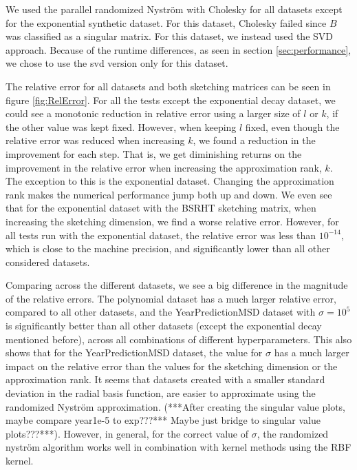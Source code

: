 \documentclass{article}
\theoremstyle{definition}
\begin{document}
We used the parallel randomized Nyström with Cholesky for all datasets except for the exponential synthetic dataset. For this dataset, Cholesky failed since $B$ was classified as a singular matrix. For this dataset, we instead used the SVD approach. Because of the runtime differences, as seen in section \ref{sec:performance}, we chose to use the svd version only for this dataset.\newline

The relative error for all datasets and both sketching matrices can be seen in figure \ref{fig:RelError}. For all the tests except the exponential decay dataset, we could see a monotonic reduction in relative error using a larger size of $l$ or $k$, if the other value was kept fixed. However, when keeping $l$ fixed, even though the relative error was reduced when increasing $k$, we found a reduction in the improvement for each step. That is, we get diminishing returns on the improvement in the relative error when increasing the approximation rank, $k$. The exception to this is the exponential dataset. Changing the approximation rank makes the numerical performance jump both up and down. We even see that for the exponential dataset with the BSRHT sketching matrix, when increasing the sketching dimension, we find a worse relative error. However, for all tests run with the exponential dataset, the relative error was less than $10^{-14}$, which is close to the machine precision, and significantly lower than all other considered datasets. \newline

Comparing across the different datasets, we see a big difference in the magnitude of the relative errors. The polynomial dataset has a much larger relative error, compared to all other datasets, and the YearPredictionMSD dataset with $\sigma=10^5$ is significantly better than all other datasets (except the exponential decay mentioned before), across all combinations of different hyperparameters. This also shows that for the YearPredictionMSD dataset, the value for $\sigma$ has a much larger impact on the relative error than the values for the sketching dimension or the approximation rank. It seems that datasets created with a smaller standard deviation in the radial basis function, are easier to approximate using the randomized Nyström approximation. (***After creating the singular value plots, maybe compare year1e-5 to exp???*** Maybe just bridge to singular value plots???***). However, in general, for the correct value of $\sigma$, the randomized nyström algorithm works well in combination with kernel methods using the RBF kernel. \newline
\end{document}
